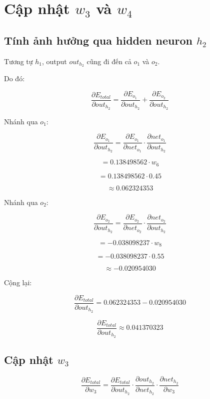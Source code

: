 \section{Cập nhật $w_3$ và $w_4$}

\subsection{Tính ảnh hưởng qua hidden neuron $h_2$}

Tương tự $h_1$, output $out_{h_2}$ cũng đi đến cả $o_1$ và $o_2$.

Do đó:

\[
    \frac{\partial E_{total}}{\partial out_{h_2}}
    =
    \frac{\partial E_{o_1}}{\partial out_{h_2}}
    +
    \frac{\partial E_{o_2}}{\partial out_{h_2}}
\]

Nhánh qua $o_1$:

\[
    \frac{\partial E_{o_1}}{\partial out_{h_2}}
    =
    \frac{\partial E_{o_1}}{\partial net_{o_1}}
    \cdot
    \frac{\partial net_{o_1}}{\partial out_{h_2}}
\]

\[
    =
    0.138498562\cdot w_6
\]

\[
    =
    0.138498562\cdot 0.45
\]

\[
    \approx 0.062324353
\]

Nhánh qua $o_2$:

\[
    \frac{\partial E_{o_2}}{\partial out_{h_2}}
    =
    \frac{\partial E_{o_2}}{\partial net_{o_2}}
    \cdot
    \frac{\partial net_{o_2}}{\partial out_{h_2}}
\]

\[
    =
    -0.038098237\cdot w_8
\]

\[
    =
    -0.038098237\cdot 0.55
\]

\[
    \approx -0.020954030
\]

Cộng lại:

\[
    \frac{\partial E_{total}}{\partial out_{h_2}}
    =
    0.062324353
    -
    0.020954030
\]

\[
    \frac{\partial E_{total}}{\partial out_{h_2}}
    \approx 0.041370323
\]

\subsection{Cập nhật $w_3$}

\[
    \frac{\partial E_{total}}{\partial w_3}
    =
    \frac{\partial E_{total}}{\partial out_{h_2}}
    \cdot
    \frac{\partial out_{h_2}}{\partial net_{h_2}}
    \cdot
    \frac{\partial net_{h_2}}{\partial w_3}
\]

